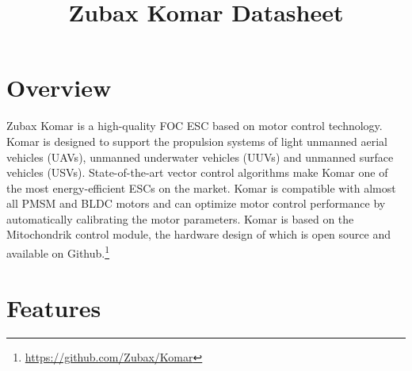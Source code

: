 \documentclass{zubaxdoc}
\title{Zubax Komar Datasheet}
\begin{document}
\frontmatter
\begin{titlepage}

\section*{Overview}

Zubax Komar is a high-quality FOC ESC based on  motor control technology. Komar is designed to
support the propulsion systems of light unmanned aerial vehicles (UAVs), unmanned underwater vehicles (UUVs)
and unmanned surface vehicles (USVs). State-of-the-art vector control algorithms make Komar one of the most
energy-efficient ESCs on the market. Komar is compatible with almost all PMSM and BLDC motors and can
optimize motor control performance by automatically calibrating the motor parameters. Komar is based
on the Mitochondrik control module, the hardware design of which is open source and available on
Github.\footnote{\url{https://github.com/Zubax/Komar}}


\section*{Features}


\end{titlepage}
\end{document}
